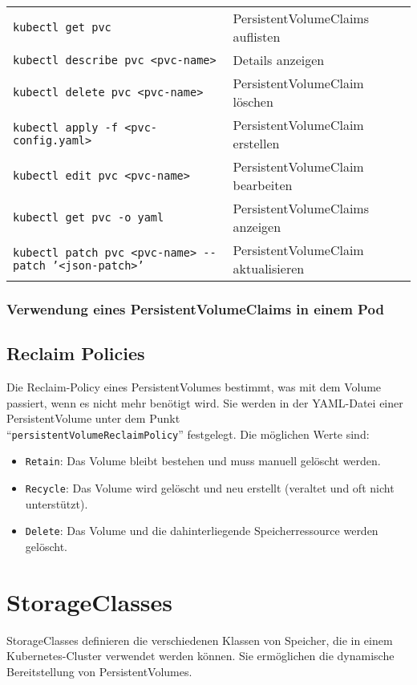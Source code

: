 \noindent
\begin{tabular}{|p{}|p{}|}
\hline
\texttt{kubectl get pvc} & PersistentVolumeClaims auflisten \\
\texttt{kubectl describe pvc <pvc-name>} & Details anzeigen \\
\texttt{kubectl delete pvc <pvc-name>} & PersistentVolumeClaim löschen \\
\texttt{kubectl apply -f <pvc-config.yaml>} & PersistentVolumeClaim erstellen \\
\texttt{kubectl edit pvc <pvc-name>} & PersistentVolumeClaim bearbeiten \\
\texttt{kubectl get pvc -o yaml} & PersistentVolumeClaims anzeigen \\
\texttt{kubectl patch pvc <pvc-name> {-}{-}patch '<json-patch>'} & PersistentVolumeClaim aktualisieren \\
\hline
\end{tabular}
\newpage
\subsubsection{Verwendung eines PersistentVolumeClaims in einem Pod}


\subsection{Reclaim Policies}
Die Reclaim-Policy eines PersistentVolumes bestimmt, was mit dem Volume passiert, wenn es nicht mehr benötigt wird. Sie werden in der YAML-Datei einer PersistentVolume unter dem Punkt\\ \enquote{\texttt{persistentVolumeReclaimPolicy}} festgelegt. Die möglichen Werte sind:

\begin{itemize}
    \item \texttt{Retain}: Das Volume bleibt bestehen und muss manuell gelöscht werden.
    \item \texttt{Recycle}: Das Volume wird gelöscht und neu erstellt (veraltet und oft nicht unterstützt).
    \item \texttt{Delete}: Das Volume und die dahinterliegende Speicherressource werden gelöscht.
\end{itemize}
\section{StorageClasses}
StorageClasses definieren die verschiedenen Klassen von Speicher, die in einem Kubernetes-Cluster verwendet werden können. Sie ermöglichen die dynamische Bereitstellung von PersistentVolumes. \\
